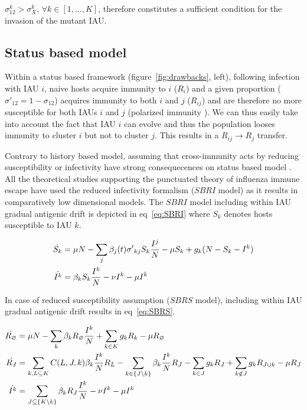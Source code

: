 $\sigma^k_{12} > \sigma_X^k$, $\forall{k} \in [1, ..., K]$, therefore
constitutes a sufficient condition for the invasion of the mutant
IAU.





\subsection{Status based model}



Within a status based framework (figure~\ref{fig:drawbacks}, left),
following infection with IAU $i$, naive hosts acquire immunity to $i$
($R_i$) and a given proportion ($\sigma'_{12}=1-\sigma_{12}$) acquires
immunity to both $i$ and $j$ ($R_{ij}$) and are therefore no more
susceptible for both IAUs $i$ and $j$ (polarized immunity
\citet{Gog2002a}).  We can thus easily take into account the fact that
IAU $i$ can evolve and thus the population looses immunity to cluster
$i$ but not to cluster $j$. This results in a $R_{ij} \rightarrow R_j$
transfer.

Contrary to history based model, assuming that cross-immunity acts by
reducing susceptibility or infectivity have strong consequecences on
status based model \citep{Ballesteros2009}.  All the theoretical
studies supporting the punctuated theory of influenza immune escape
have used the reduced infectivity formalism ($SBRI$ model) as it
results in comparatively low dimensional models.  The $SBRI$ model
including within IAU gradual antigenic drift is depicted in
eq~\eqref{eq:SBRI} where $S_k$ denotes hosts susceptible to IAU $k$.

\begin{footnotesize}
  \begin{align}
    \label{eq:SBRI}
    \dot{S_k} &= \mu N -\sum_j \beta_j(t) {\sigma'}_{kj} S_k
    \frac{I^j}{N}
    - \mu S_k +g_k (N-S_k-I^k)\\
    \dot{I^k} &= \beta_k S_k \frac{I^k}{N} -\nu I^k -\mu I^k \notag
  \end{align}
\end{footnotesize}

In case of reduced susceptibility assumption ($SBRS$ model), including
within IAU gradual antigenic drift results in eq~\eqref{eq:SBRS}.

\begin{footnotesize}
  \begin{align}
    \label{eq:SBRS}
    \dot{R_\varnothing} &= \mu N -\sum_k \beta_k R_\varnothing
    \frac{I^k}{N} +\sum_{k \in K} g_k
    R_k - \mu R_\varnothing\\
    \dot{R_J} &= \sum_{k, L \subseteq K} C(L,J,k) \beta_k
    \frac{I^k}{N} R_L -\sum_{k \in \{J \setminus k\}} \beta_k
    \frac{I^k}{N} R_J -\sum_{k \in J} g_k R_J + \sum_{k \notin J} g_k
    R_{J \cup k} -\mu R_J \notag \\
    \dot{I^k} &= \sum_{J \subseteq \{K \setminus k\}} \beta_k R_J
    \frac{I^k}{N} -\nu I^k -\mu I^k \notag
  \end{align}
\end{footnotesize}


